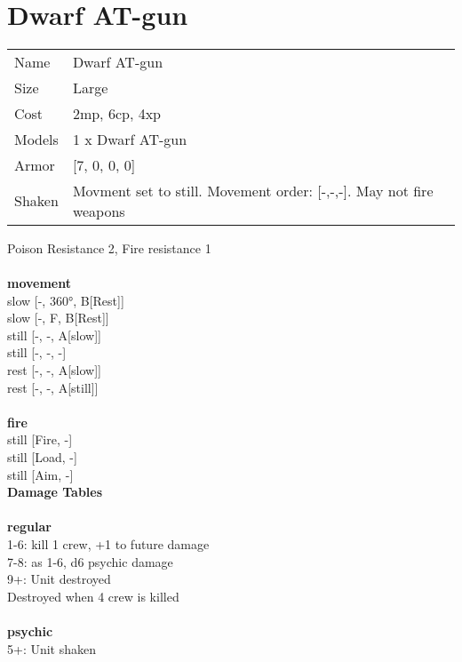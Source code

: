 \ \\

\ \\
 
\ \\













\clearpage

\section{ Dwarf AT-gun }

\begin{tabular}{ll}
  Name & Dwarf AT-gun \\
  Size & Large\\
  Cost & 2mp, 6cp, 4xp\\
  Models & 1 x Dwarf AT-gun\\
  Armor & [7, 0, 0, 0]\\
  Shaken & Movment set to still. Movement order: [-,-,-]. May not fire weapons\\
\end{tabular}

\noindent Poison Resistance 2, Fire resistance 1\\ 


\ \\ {\bf movement } \\
slow [-, 360°, B[Rest]] \\
slow [-, F, B[Rest]] \\
still [-, -, A[slow]] \\
still [-, -, -] \\
rest [-, -, A[slow]] \\
rest [-, -, A[still]] \\
\ \\ {\bf fire } \\
still [Fire, -] \\
still [Load, -] \\
still [Aim, -] \\


{\bf Damage Tables} \\
\ \\ {\bf regular } \\
1-6: kill 1 crew, +1 to future damage \\
7-8: as 1-6, d6 psychic damage \\
9+: Unit destroyed \\
Destroyed when 4 crew is killed \\
\ \\ {\bf psychic } \\
5+: Unit shaken \\


